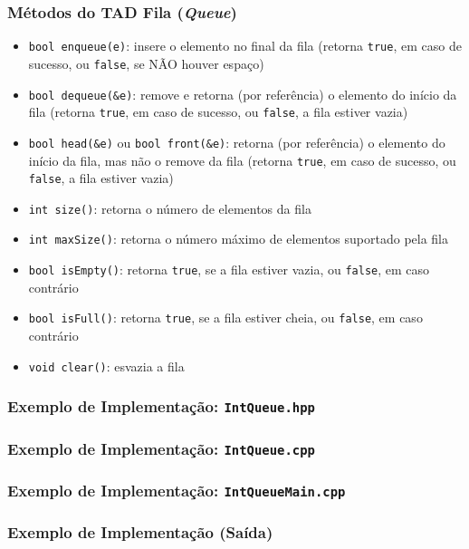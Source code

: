 \documentclass[aspectratio=169]{beamer}
\begin{document}
\begin{frame}\frametitle{Métodos do TAD Fila (\emph{Queue})}
\begin{itemize}
	\item \texttt{bool enqueue(e)}: insere o elemento no final da fila (retorna \texttt{true}, em caso de sucesso, ou \texttt{false}, se NÃO houver espaço)
	\item \texttt{bool dequeue(\&e)}: remove e retorna (por referência) o elemento do início da fila (retorna \texttt{true}, em caso de sucesso, ou \texttt{false}, a fila estiver vazia)
	\item \texttt{bool head(\&e)} ou \texttt{bool front(\&e)}: retorna (por referência) o elemento do início da fila, mas não o remove da fila (retorna \texttt{true}, em caso de sucesso, ou \texttt{false}, a fila estiver vazia)
	\item \texttt{int size()}: retorna o número de elementos da fila
	\item \texttt{int maxSize()}: retorna o número máximo de elementos suportado pela fila
	\item \texttt{bool isEmpty()}: retorna \texttt{true}, se a fila estiver vazia, ou \texttt{false}, em caso contrário
	\item \texttt{bool isFull()}: retorna \texttt{true}, se a fila estiver cheia, ou \texttt{false}, em caso contrário
	\item \texttt{void clear()}: esvazia a fila
\end{itemize}
\end{frame}

\begin{frame}\frametitle{Exemplo de Implementação: \texttt{IntQueue.hpp}}

\end{frame}

\begin{frame}\frametitle{Exemplo de Implementação: \texttt{IntQueue.cpp}}
\fontsize{3pt}{5pt}\selectfont{

}
\end{frame}
	
\begin{frame}\frametitle{Exemplo de Implementação: \texttt{IntQueueMain.cpp}}
\fontsize{5pt}{6pt}\selectfont{

}
\end{frame}
\begin{frame}\frametitle{Exemplo de Implementação (Saída)}

\end{frame}
\end{document}
